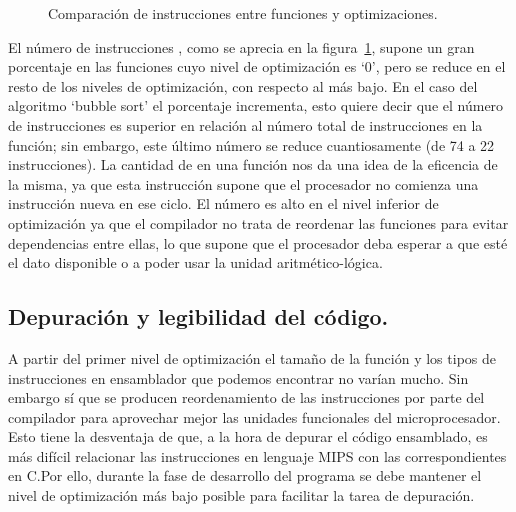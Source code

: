 \begin{figure}[htbp]
\begin{center}
\end{center}
\caption{Comparación de instrucciones  entre funciones y optimizaciones.}
\label{graph:nops}
\end{figure}
El número de instrucciones , como se aprecia en la figura~\ref{graph:nops}, supone un gran porcentaje en las funciones cuyo nivel de optimización es `0', pero se reduce en el resto de los niveles de optimización, con respecto al más bajo. En el caso del algoritmo `bubble sort' el porcentaje incrementa, esto quiere decir que el número de instrucciones  es superior en relación al número total de instrucciones en la función; sin embargo, este último número se reduce cuantiosamente (de 74 a 22 instrucciones). La cantidad de  en una función nos da una idea de la eficencia de la misma, ya que esta instrucción supone que el procesador no comienza una instrucción nueva en ese ciclo. El número es alto en el nivel inferior de optimización ya que el compilador no trata de reordenar las funciones para evitar dependencias entre ellas, lo que supone que el procesador deba esperar a que esté el dato disponible o a poder usar la unidad aritmético-lógica.

\subsection{Depuración y legibilidad del código.} %
\label{sub:Depuración y legibilidad del código.}
A partir del primer nivel de optimización el tamaño de la función y los tipos de instrucciones en ensamblador que podemos encontrar no varían mucho. Sin embargo sí que se producen reordenamiento de las instrucciones por parte del compilador para aprovechar mejor las unidades funcionales del microprocesador. Esto tiene la desventaja de que, a la hora de depurar el código ensamblado, es más difícil relacionar las instrucciones en lenguaje MIPS con las correspondientes en C.\@ Por ello, durante la fase de desarrollo del programa se debe mantener el nivel de optimización más bajo posible para facilitar la tarea de depuración.

